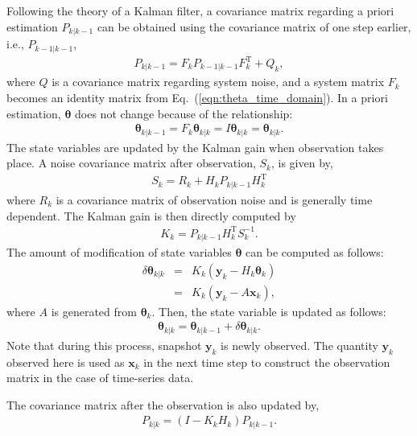 \documentclass[aip,graphicx]{revtex4-1}
\begin{document}
Following the theory of a Kalman filter, a covariance matrix regarding a priori estimation $P_{k|k-1}$ can be obtained using the covariance matrix of one step earlier, i.e., $P_{k-1|k-1}$,
\begin{eqnarray}
	P_{k|k-1} = F_k P_{k-1|k-1} F_k^\text{T} + Q_{k},
\end{eqnarray}
where $Q$ is a covariance matrix regarding system noise, and a system matrix $F_k$ becomes an identity matrix from Eq.~(\ref{eqn:theta_time_domain}).
In a priori estimation, $\bm{\theta}$ does not change because of the relationship:
\begin{eqnarray}
\bm{\theta}_{k|k-1}=F_k\bm{\theta}_{k|k}=I\bm{\theta}_{k|k}=\bm{\theta}_{k|k}.\label{eq:predicttheta} 
\end{eqnarray}
The state variables are updated by the Kalman gain when observation takes place.
A noise covariance matrix after observation, $S_k$, is given by,
\begin{eqnarray}
	S_k = R_k + {H}_k P_{k|k-1} {H}^\text{T}_k
\end{eqnarray}
where $R_k$ is a covariance matrix of observation noise and is generally time dependent.
The Kalman gain is then directly computed by
\begin{eqnarray}
K_k = P_{k|k-1} {H}^\text{T}_k S_k^{-1}.
\end{eqnarray}
The amount of modification of state variables $\bm{\theta}$ can be computed as follows:
\begin{eqnarray}
	\label{eqn:update_theta}
	\delta \bm{\theta}_{k|k} &=& K_k \left( \bm{y}_k - H_k \bm{\theta}_k \right)\\
	&=& K_k \left( \bm{y}_k - A \bm{x}_k \right), \label{eq:deltatheta}
\end{eqnarray}
where $A$ is generated from $\bm{\theta}_k$. Then, the state variable is updated as follows:
\begin{eqnarray}
	\bm{\theta}_{k|k} = \bm{\theta}_{k|k-1} + \delta \bm{\theta}_{k|k}. \label{eq:updatetheta}
\end{eqnarray}
Note that during this process, snapshot $\bm{y}_k$ is newly observed.
The quantity $\bm{y}_k$ observed here is used as $\bm{x}_k$ in the next time step to construct the observation matrix in the case of time-series data.

The covariance matrix after the observation is also updated by,
\begin{eqnarray}
	\label{eqn:cov_innovation}
	P_{k|k} = (I - K_k {H}_k) P_{k|k-1}.
\end{eqnarray}
\end{document}
